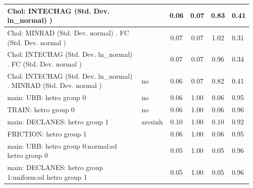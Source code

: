 \begin{table}
\begin{center}
\begin{tabular}{|l|l|c|c|c|l|}
			\hline
			 Chol: INTECHAG (Std. Dev. ln_normal) ) &  & 0.06 & 0.07 & 0.83 & 0.41 \\
			\hline
			 Chol: MINRAD (Std. Dev. normal) . FC (Std. Dev.   normal ) &  & 0.07 & 0.07 & 1.02 & 0.31 \\
			\hline
			 Chol: INTECHAG (Std. Dev. ln_normal) . FC (Std. Dev.   normal ) &  & 0.07 & 0.07 & 0.96 & 0.34 \\
			\hline
			 Chol: INTECHAG (Std. Dev. ln_normal) . MINRAD (Std. Dev.   normal ) & no & 0.06 & 0.07 & 0.82 & 0.41 \\
			\hline
			main: URB: hetro group 0 & no & 0.06 & 1.00 & 0.06 & 0.95 \\
			\hline
			TRAIN: hetro group 0 & no & 0.06 & 1.00 & 0.06 & 0.96 \\
			\hline
			main: DECLANES: hetro group 1 & arcsinh & 0.10 & 1.00 & 0.10 & 0.92 \\
			\hline
			FRICTION: hetro group 1 &  & 0.06 & 1.00 & 0.06 & 0.95 \\
			\hline
			main: URB: hetro group 0:normal:sd  hetro group 0 &  & 0.05 & 1.00 & 0.05 & 0.96 \\
			\hline
			main: DECLANES: hetro group 1:uniform:sd  hetro group 1 &  & 0.05 & 1.00 & 0.05 & 0.96 \\
			\hline
		\end{tabular}
	\end{center}
\end{table}